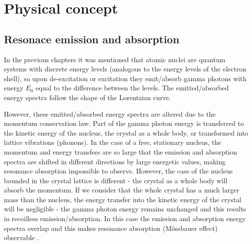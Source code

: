 \section{Physical concept}

\subsection{Resonace emission and absorption}
In the previous chapters it was mentioned that atomic nuclei are quantum systems with discrete energy levels (analogous to the energy levels of the electron shell), so upon de-excitation or excitation they emit/absorb gamma photons with energy $E_0$ equal to the difference between the levels. The emitted/absorbed energy spectra follow the shape of the Lorentzian curve. 
\par
However, these emitted/absorbed energy spectra are altered due to the momentum conservation law. Part of the gamma photon energy is transferred to the kinetic energy of the nucleus, the crystal as a whole body, or transformed into lattice vibrations (phonons). 
In the case of a free, stationary nucleus, the momentum and energy transfers are so large that the emission and absorption spectra are shifted in different directions by large energetic values, making resonance absorption impossible to observe. However, the case of the nucleus bounded in the crystal lattice is different - the crystal as a whole body will absorb the momentum. If we consider that the whole crystal has a much larger mass than the nucleus, the energy transfer into the kinetic energy of the crystal will be negligible - the gamma photon energy remains unchanged and this results in recoilless emission/absorption. In this case the emission and absorption energy spectra overlap and this makes resonance absorption (Mössbauer effect) observable \cite{moss}.
